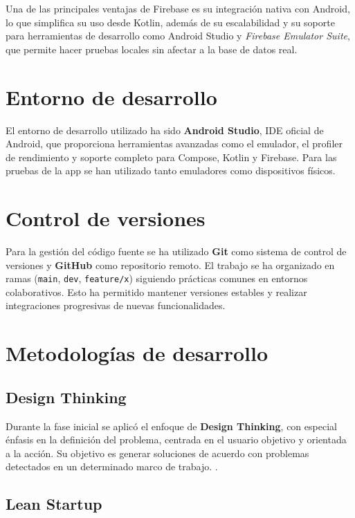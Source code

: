 Una de las principales ventajas de Firebase es su integración nativa con Android, lo que simplifica su uso desde Kotlin, además de su escalabilidad y su soporte para herramientas de desarrollo como Android Studio y \textit{Firebase Emulator Suite}, que permite hacer pruebas locales sin afectar a la base de datos real.


\section{Entorno de desarrollo}

El entorno de desarrollo utilizado ha sido \textbf{Android Studio}, IDE oficial de Android, que proporciona herramientas avanzadas como el emulador, el profiler de rendimiento y soporte completo para Compose, Kotlin y Firebase. Para las pruebas de la app se han utilizado tanto emuladores como dispositivos físicos.

\section{Control de versiones}

Para la gestión del código fuente se ha utilizado \textbf{Git} como sistema de control de versiones y \textbf{GitHub} como repositorio remoto. El trabajo se ha organizado en ramas (\texttt{main}, \texttt{dev}, \texttt{feature/x}) siguiendo prácticas comunes en entornos colaborativos. Esto ha permitido mantener versiones estables y realizar integraciones progresivas de nuevas funcionalidades.

\section{Metodologías de desarrollo}

\subsection{Design Thinking}

Durante la fase inicial se aplicó el enfoque de \textbf{Design Thinking}, con especial énfasis en la definición del problema, centrada en el usuario objetivo y orientada a la acción. Su objetivo es generar soluciones de acuerdo con problemas detectados en un determinado marco de trabajo.   \cite{designthinking} \cite{designthinking-url}.

\subsection{Lean Startup}

